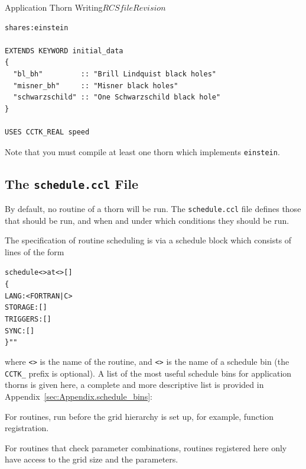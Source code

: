 \begin{cactuspart}{Application Thorn Writing}{$RCSfile$}{$Revision$}
\begin{verbatim}
shares:einstein

EXTENDS KEYWORD initial_data
{
  "bl_bh"         :: "Brill Lindquist black holes"
  "misner_bh"     :: "Misner black holes"
  "schwarzschild" :: "One Schwarzschild black hole"
}

USES CCTK_REAL speed

\end{verbatim}

Note that you must compile at least one thorn which implements \texttt{einstein}.



\subsection{The \texttt{schedule.ccl} File}
\label{subsec:schedule_ccl}
By default, no routine of a thorn will be run.  The \texttt{schedule.ccl}
file defines those that should be run, and when and under which
conditions they should be run.

The specification of routine scheduling is via a schedule block which
consists of lines of the form

\begin{alltt}
schedule <> at <> []
\{
  LANG:     <FORTRAN|C>
  STORAGE:  []
  TRIGGERS: []
  SYNC:     []
\} ""
\end{alltt}
where \texttt{<>} is the name of the routine, and
\texttt{<>} is the name of a schedule bin (the \texttt{CCTK\_}
prefix is optional). A list of the most useful schedule bins for application
thorns is given here, a complete and more descriptive list is provided in
Appendix~\ref{sec:Appendix.schedule_bins}:

\begin{Lentry}

\item [\texttt{CCTK\_STARTUP}]
For routines, run before the grid hierarchy is set up, for example, function
registration.

\item [\texttt{CCTK\_PARAMCHECK}]
For routines that check parameter combinations, routines registered here
only have access to the grid size and the parameters.


\end{Lentry}
\end{cactuspart}
